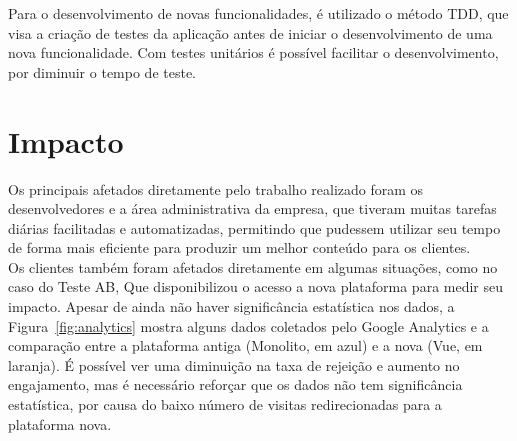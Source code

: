 Para o desenvolvimento de novas funcionalidades, é utilizado o método \gls{TDD}, que visa a criação de testes da aplicação antes de iniciar o desenvolvimento de uma nova funcionalidade. Com testes unitários é possível facilitar o desenvolvimento, por diminuir o tempo de teste.\\

%

\section{Impacto}

Os principais afetados diretamente pelo trabalho realizado foram os desenvolvedores e a área administrativa da empresa, que tiveram muitas tarefas diárias facilitadas e automatizadas, permitindo que pudessem utilizar seu tempo de forma mais eficiente para produzir um melhor conteúdo para os clientes.\\

Os clientes também foram afetados diretamente em algumas situações, como no caso do \gls{Teste AB}, Que disponibilizou o acesso a nova plataforma para medir seu impacto. Apesar de ainda não haver significância estatística nos dados, a Figura~\ref{fig:analytics} mostra alguns dados coletados pelo Google Analytics e a comparação entre a plataforma antiga (Monolito, em azul) e a nova (Vue, em laranja). É possível ver uma diminuição na taxa de rejeição e aumento no engajamento, mas é necessário reforçar que os dados não tem significância estatística, por causa do baixo número de visitas redirecionadas para a plataforma nova.\\

